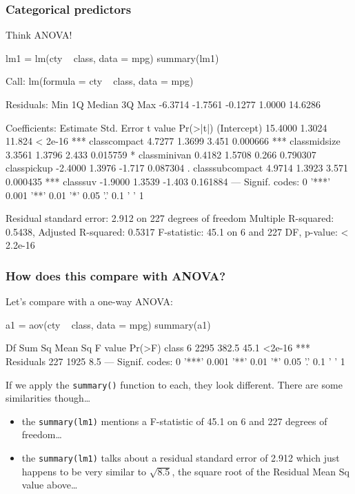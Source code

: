 \documentclass[a4paper]{article}\usepackage[]{graphicx}\usepackage[]{xcolor}
\begin{document}
\subsubsection{Categorical predictors}
Think ANOVA!
\begin{Schunk}
\begin{Sinput}
lm1 = lm(cty ~ class, data = mpg)
summary(lm1)
\end{Sinput}
\begin{Soutput}

Call:
lm(formula = cty ~ class, data = mpg)

Residuals:
    Min      1Q  Median      3Q     Max 
-6.3714 -1.7561 -0.1277  1.0000 14.6286 

Coefficients:
                Estimate Std. Error t value Pr(>|t|)    
(Intercept)      15.4000     1.3024  11.824  < 2e-16 ***
classcompact      4.7277     1.3699   3.451 0.000666 ***
classmidsize      3.3561     1.3796   2.433 0.015759 *  
classminivan      0.4182     1.5708   0.266 0.790307    
classpickup      -2.4000     1.3976  -1.717 0.087304 .  
classsubcompact   4.9714     1.3923   3.571 0.000435 ***
classsuv         -1.9000     1.3539  -1.403 0.161884    
---
Signif. codes:  0 '***' 0.001 '**' 0.01 '*' 0.05 '.' 0.1 ' ' 1

Residual standard error: 2.912 on 227 degrees of freedom
Multiple R-squared:  0.5438,	Adjusted R-squared:  0.5317 
F-statistic:  45.1 on 6 and 227 DF,  p-value: < 2.2e-16
\end{Soutput}
\end{Schunk}
\subsubsection{How does this compare with ANOVA?}
Let's compare with a one-way ANOVA:
\begin{Schunk}
\begin{Sinput}
a1 = aov(cty ~ class, data = mpg)
summary(a1)
\end{Sinput}
\begin{Soutput}
             Df Sum Sq Mean Sq F value Pr(>F)    
class         6   2295   382.5    45.1 <2e-16 ***
Residuals   227   1925     8.5                   
---
Signif. codes:  0 '***' 0.001 '**' 0.01 '*' 0.05 '.' 0.1 ' ' 1
\end{Soutput}
\end{Schunk}
If we apply the \lstinline|summary()| function to each, they look different.
There are some similarities though\dots
\begin{itemize}
	\item the \lstinline|summary(lm1)| mentions a F-statistic of 45.1 on 6 and 227 degrees of freedom\dots
	\item the \lstinline|summary(lm1)| talks about a residual standard error of 2.912 which just happens to be very similar to \( \sqrt{8.5} \), the square root of the Residual Mean Sq value above\dots
\end{itemize}
\end{document}
